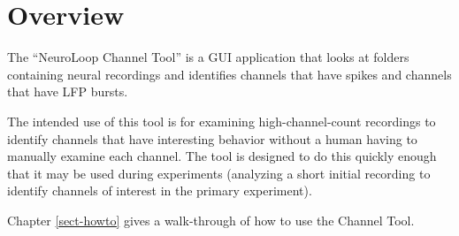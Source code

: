 
\chapter{Overview}
\label{sect-over}

The ``NeuroLoop Channel Tool'' is a GUI application that looks at folders
containing neural recordings and identifies channels that have spikes and
channels that have LFP bursts.

The intended use of this tool is for examining high-channel-count recordings
to identify channels that have interesting behavior without a human having
to manually examine each channel. The tool is designed to do this quickly
enough that it may be used during experiments (analyzing a short initial
recording to identify channels of interest in the primary experiment).

Chapter \ref{sect-howto} gives a walk-through of how to use the Channel Tool.


%
